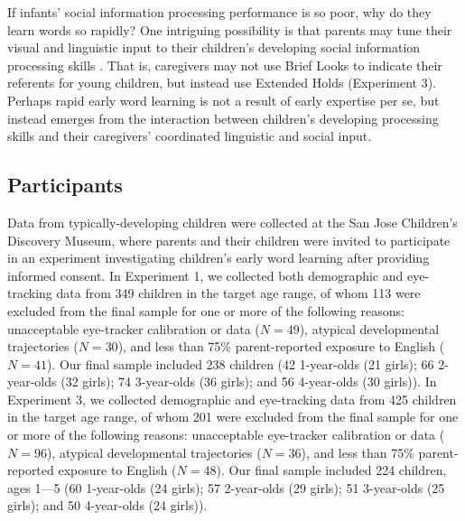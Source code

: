 \documentclass{pnastwo}
\begin{document}
\begin{article}
If infants' social information processing performance is so poor, why do they learn words so rapidly? One intriguing possibility is that parents may tune their visual and linguistic input to their children's developing social information processing skills \citep{snow1972,gogate2000,brand2002}. That is, caregivers may not use Brief Looks to indicate their referents for young children, but instead use Extended Holds (Experiment 3). Perhaps rapid early word learning is not a result of early expertise per se, but instead emerges from the interaction between children's developing processing skills and their caregivers' coordinated linguistic and social input.

\begin{materials}

\subsection{Participants} Data from typically-developing children were collected at the San Jose Children's Discovery Museum, where parents and their children were invited to participate in an experiment investigating children's early word learning after providing informed consent. In Experiment 1, we collected both demographic and eye-tracking data from 349 children in the target age range, of whom 113 were excluded from the final sample for one or more of the following reasons: unacceptable eye-tracker calibration or data ({\small$N=49$}), atypical developmental trajectories ({\small$N=30$}), and less than 75\% parent-reported exposure to English ({\small$N=41$}). Our final sample included 238 children (42 1-year-olds (21 girls); 66 2-year-olds (32 girls); 74 3-year-olds (36 girls); and 56 4-year-olds (30 girls)). In Experiment 3, we collected demographic and eye-tracking data from 425 children in the target age range, of whom 201 were excluded from the final sample for one or more of the following reasons: unacceptable eye-tracker calibration or data ({\small$N=96$}), atypical developmental trajectories ({\small$N=36$}), and less than 75\% parent-reported exposure to English ({\small$N=48$}). Our final sample included 224 children, ages 1---5 (60 1-year-olds (24 girls); 57 2-year-olds (29 girls); 51 3-year-olds (25 girls); and 50 4-year-olds (24 girls)).


\end{materials}
\end{article}
\end{document}
